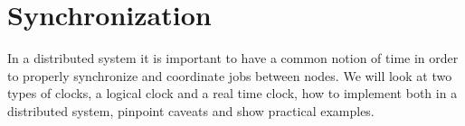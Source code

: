 \chapter{Synchronization} \label{ch:synchronization}

In a distributed system it is important to have a common notion of time in order to properly synchronize and coordinate jobs between nodes. We will look at two types of clocks, a logical clock and a real time clock, how to implement both in a distributed system, pinpoint caveats and show practical examples.




